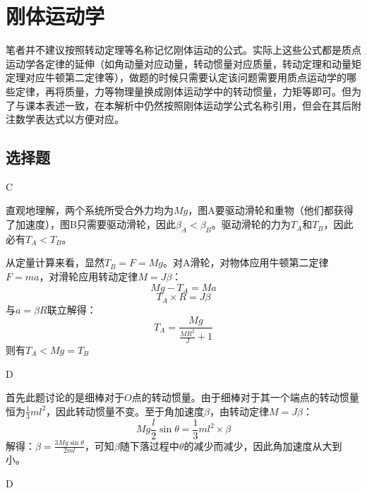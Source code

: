 \documentclass[b5paper,opensource,sourcefont,parskip]{qyxf-book}
\begin{document}
\chapter{刚体运动学}
\note 笔者并不建议按照转动定理等名称记忆刚体运动的公式。实际上这些公式都是质点运动学各定律的延伸（如角动量对应动量，转动惯量对应质量，转动定理和动量矩定理对应牛顿第二定律等），做题的时候只需要认定该问题需要用质点运动学的哪些定律，再将质量，力等物理量换成刚体运动学中的转动惯量，力矩等即可。但为了与课本表述一致，在本解析中仍然按照刚体运动学公式名称引用，但会在其后附注数学表达式以方便对应。

\section{选择题}
C

直观地理解，两个系统所受合外力均为$ Mg $，图A要驱动滑轮和重物（他们都获得了加速度），图B只需要驱动滑轮，因此$ \beta_A<\beta_B $。驱动滑轮的力为$ T_A $和$ T_B $，因此必有$ T_A<T_B $。

从定量计算来看，显然$ T_B=F=Mg $。对A滑轮，对物体应用牛顿第二定律$F=ma$，对滑轮应用转动定律$M=J\beta$：
\[Mg-T_A=Ma\]
			\[T_A\times R=J\beta\]
与$ a=\beta R $联立解得：
\[T_A=\frac{Mg}{\frac{MR^2}{J}+1}\]
则有$ T_A< Mg=T_B$

D


首先此题讨论的是细棒对于$ O $点的转动惯量。由于细棒对于其一个端点的转动惯量恒为$ \frac{1}{3}ml^2 $，因此转动惯量不变。至于角加速度$ \beta $，由转动定律$M=J\beta$：
\[Mg\frac{l}{2}\sin\theta=\frac{1}{3}ml^2\times\beta\]
解得：$ \beta=\frac{3Mg\sin\theta}{2ml} $，可知$ \beta $随下落过程中$ \theta $的减少而减少，因此角加速度从大到小。
			
D
\end{document}
